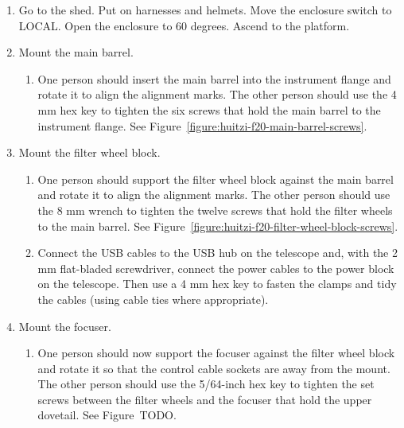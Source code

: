 \begin{enumerate}

\item Go to the shed. Put on harnesses and helmets. Move the enclosure switch to LOCAL. Open the enclosure to 60 degrees. Ascend to the platform.
    
\item Mount the main barrel.

\begin{enumerate}
    
  \item One person should insert the main barrel into the instrument flange and rotate it to align the alignment marks. The other person should use the 4 mm hex key to tighten the six screws that hold the main barrel to the instrument flange. See Figure~\ref{figure:huitzi-f20-main-barrel-screws}.

\end{enumerate}

\item Mount the filter wheel block.

\begin{enumerate}
    
  \item One person should support the filter wheel block against the main barrel and rotate it to align the alignment marks. The other person should use the 8 mm wrench to tighten the twelve screws that hold the filter wheels to the main barrel. See Figure~\ref{figure:huitzi-f20-filter-wheel-block-screws}.

   \item Connect the USB cables to the USB hub on the telescope and, with the 2 mm flat-bladed screwdriver, connect the power cables to the power block on the telescope. Then use a 4 mm hex key to fasten the clamps and tidy the cables (using cable ties where appropriate).
  
\end{enumerate}

\item Mount the focuser.

\begin{enumerate}
  
  \item One person should now support the focuser against the filter wheel block and rotate it so that the control cable sockets are away from the mount.
  The other person should use the 5/64-inch hex key to tighten the set screws between the filter wheels and the focuser that hold the upper dovetail. See Figure~TODO.


\end{enumerate}
\end{enumerate}
